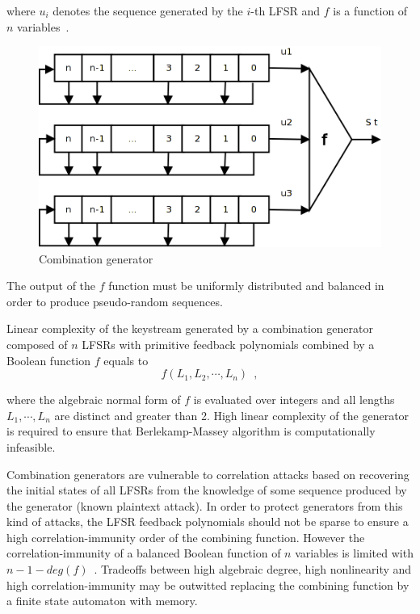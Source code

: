 where $u_i$ denotes the sequence generated by the $i$-th LFSR and $f$ is a
function of $n$ variables~\cite{encyclopedia_of_cryptography}.
\begin{figure}[htbp]
    \centering
    \includegraphics[scale=0.5]{images/comb-gen}
    \caption{Combination generator}
    \label{fig:comb-gen}
\end{figure}
The output of the $f$ function must be uniformly distributed and balanced in
order to produce pseudo-random sequences.

Linear complexity of the keystream generated by a combination generator composed
of $n$ LFSRs with primitive feedback polynomials combined by a Boolean function
$f$ equals to
\begin{equation}
    \label{eqn:lin-complexity}
    f(L_1, L_2, \cdots, L_n) \enspace,
\end{equation}

where the algebraic normal form of $f$ is evaluated over
integers and all lengths $L_1, \cdots, L_n$ are distinct and greater than 2.
High linear complexity of the generator is required to ensure that
Berlekamp-Massey algorithm is computationally infeasible.

Combination generators are vulnerable to correlation attacks based on
recovering the initial states of all LFSRs from the knowledge of some sequence
produced by the generator (known plaintext attack). In order to protect
generators from this kind of attacks, the LFSR feedback polynomials should not
be sparse to ensure a high correlation-immunity order of the combining function.
However the correlation-immunity of a balanced Boolean function of $n$ variables
is limited with $n - 1 - deg(f)$~\cite{encyclopedia_of_cryptography}. Tradeoffs
between high algebraic degree, high nonlinearity and high correlation-immunity
may be outwitted replacing the combining function by a finite state automaton
with memory.

